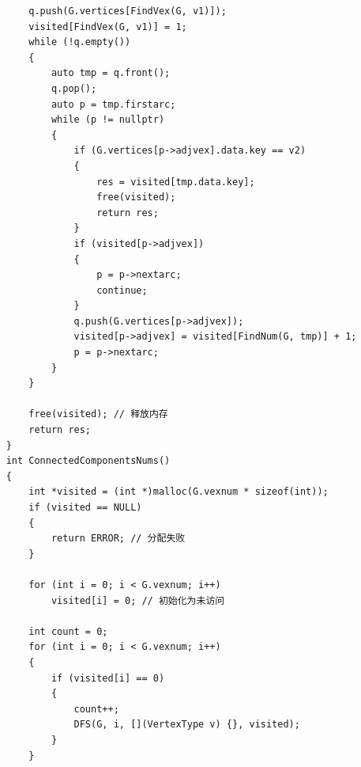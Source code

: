 \documentclass[supercite]{Experimental_Report}
\theoremstyle{definition}
\begin{document}
\begin{lstlisting}
        q.push(G.vertices[FindVex(G, v1)]);
        visited[FindVex(G, v1)] = 1;
        while (!q.empty())
        {
            auto tmp = q.front();
            q.pop();
            auto p = tmp.firstarc;
            while (p != nullptr)
            {
                if (G.vertices[p->adjvex].data.key == v2)
                {
                    res = visited[tmp.data.key];
                    free(visited);
                    return res;
                }
                if (visited[p->adjvex])
                {
                    p = p->nextarc;
                    continue;
                }
                q.push(G.vertices[p->adjvex]);
                visited[p->adjvex] = visited[FindNum(G, tmp)] + 1;
                p = p->nextarc;
            }
        }

        free(visited); // 释放内存
        return res;
    }
    int ConnectedComponentsNums()
    {
        int *visited = (int *)malloc(G.vexnum * sizeof(int));
        if (visited == NULL)
        {
            return ERROR; // 分配失败
        }

        for (int i = 0; i < G.vexnum; i++)
            visited[i] = 0; // 初始化为未访问

        int count = 0;
        for (int i = 0; i < G.vexnum; i++)
        {
            if (visited[i] == 0)
            {
                count++;
                DFS(G, i, [](VertexType v) {}, visited);
            }
        }


\end{lstlisting}
\end{document}
